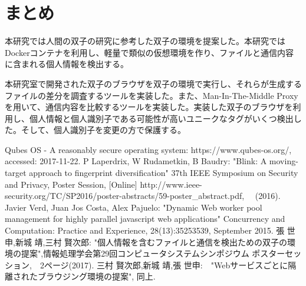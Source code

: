 \documentclass[a4paper,twocolumn,10pt]{jarticle}
\begin{document}
\section{まとめ}
本研究では人間の双子の研究に参考した双子の環境を提案した。本研究ではDockerコンテナを利用し、軽量で類似の仮想環境を作り、ファイルと通信内容に含まれる個人情報を検出する。

本研究室で開発された双子のブラウザを双子の環境で実行し、それらが生成するファイルの差分を調査するツールを実装した。また、Man-In-The-Middle Proxyを用いて、通信内容を比較するツールを実装した。実装した双子のブラウザを利用し、個人情報と個人識別子である可能性が高いユニークなタグがいくつ検出した。そして、個人識別子を変更の方で保護する。



\begin{thebibliography}{1}

 {\small Qubes OS - A reasonably secure operating system: https://www.qubes-os.org/, accessed: 2017-11-22.}
 P Laperdrix, W Rudametkin, B Baudry: "Blink: A moving-target approach to fingerprint diversification" 37th IEEE Symposium on Security and Privacy, Poster Session, [Online]
http://www.ieee-security.org/TC/SP2016/poster-abstracts/59-poster\_abstract.pdf, 　(2016).
Javier Verd, Juan Jos Costa, Alex Pajuelo: "Dynamic Web worker pool management for highly parallel javascript web applications" Concurrency and Computation: Practice and Experience, 28(13):35253539, September 2015.
張 世申,新城 靖,三村 賢次郎: "個人情報を含むファイルと通信を検出ための双子の環境の提案",情報処理学会第29回コンピュータシステムシンポジウム ポスターセッション,　2ページ(2017).
三村 賢次郎,新城 靖,張 世申:　"Webサービスごとに隔離されたブラウジング環境の提案", 同上.
\end{thebibliography}
\end{document}
